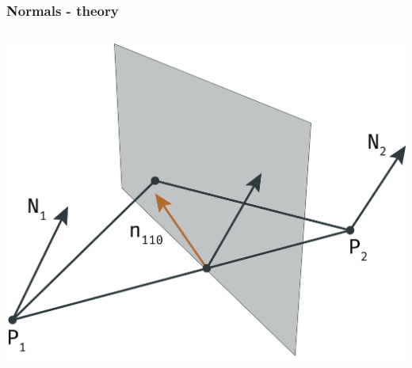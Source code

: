 	\begin{frame}\frametitle{Normals - theory}
		\begin{columns}
			\begin{column}{0.6\textwidth}
				\begin{center}
					\includegraphics[width=\textwidth]{img/1_single/computingNormals.png}
				\end{center}
			\end{column}
		\end{columns}
	\end{frame}

